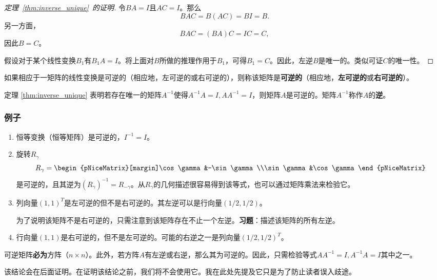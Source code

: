 \begin{proof}[定理~\ref{thm:inverse_unique}~的证明]
    令$BA=I$且$AC=I$。那么\[BAC=B(AC)=BI=B.\]
    另一方面，\[BAC=(BA)C=IC=C,\]
    因此$B=C$。

    假设对于某个线性变换$B_1$有$B_1A=I$。将上面对$B$所做的推理作用于$B_1$，可得$B_1=C$。因此，左逆$B$是唯一的。类似可证$C$的唯一性。
\end{proof}

\begin{definition*}
    如果相应于一矩阵的线性变换是可逆的（相应地，左可逆的或右可逆的），则称该矩阵是{\bf 可逆的}（相应地，{\bf 左可逆的}或{\bf 右可逆的}）。
\end{definition*}

定理 \ref{thm:inverse_unique} 表明若存在唯一的矩阵$A^{-1}$使得$A^{-1}A=I,AA^{-1}=I$，则矩阵$A$是可逆的。矩阵$A^{-1}$称作$A$的{\bf 逆}。

\subsubsection*{例子}

\begin{enumerate}
    \item 恒等变换（恒等矩阵）是可逆的，$I^{-1} = I$。
    \item 旋转$R_\gamma$\[R_\gamma=\begin{pNiceMatrix}[margin]\cos\gamma&-\sin\gamma\\\sin\gamma&\cos\gamma\end{pNiceMatrix}\]
    是可逆的，且其逆为$(R_{\gamma})^{-1}=R_{-\gamma}$。从$R_\gamma$的几何描述很容易得到该等式，也可以通过矩阵乘法来检验它。
    \item 列向量$(1,1)^T$是左可逆的但不是右可逆的。其左逆可以是行向量$(1/2,1/2)$。
    
    为了说明该矩阵不是右可逆的，只需注意到该矩阵存在不止一个左逆。{\bf 习题}：描述该矩阵的所有左逆。
    \item 行向量$(1,1)$是右可逆的，但不是左可逆的。可能的右逆之一是列向量$(1/2,1/2)^T$。
\end{enumerate}

\begin{remark}
    可逆矩阵{\bf 必为}方阵（$n\times n$）。此外，若方阵$A$有左逆或右逆，那么其为可逆的。因此，只需检验等式$AA^{-1}=I,A^{-1}A=I$其中之一。

    该结论会在后面证明。在证明该结论之前，我们将不会使用它。我在此处先提及它只是为了防止读者误入歧途。
\end{remark}

